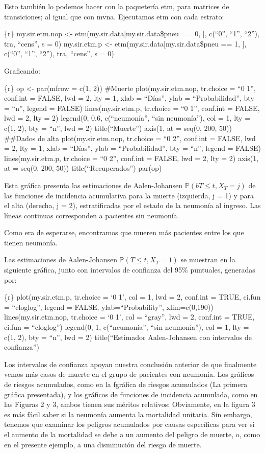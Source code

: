 \documentclass[
]{article}
\begin{document}
Esto también lo podemos hacer con la paquetería etm, para matrices de
transiciones; al igual que con mvna. Ejecutamos etm con cada estrato:

\{r\} my.sir.etm.nop \textless- etm(my.sir.data{[}my.sir.data\$pneu ==
0, {]}, c(``0'', ``1'', ``2''), tra, ``cens'', s = 0) my.sir.etm.p
\textless- etm(my.sir.data{[}my.sir.data\$pneu == 1, {]}, c(``0'',
``1'', ``2''), tra, ``cens'', s = 0)

Graficando:

\{r\} op \textless- par(mfrow = c(1, 2)) \#Muerte plot(my.sir.etm.nop,
tr.choice = ``0 1'', conf.int = FALSE, lwd = 2, lty = 1, xlab =
``Días'', ylab = ``Probabilidad'', bty = ``n'', legend = FALSE)
lines(my.sir.etm.p, tr.choice = ``0 1'', conf.int = FALSE, lwd = 2, lty
= 2) legend(0, 0.6, c(``neumonía'', ``sin neumonía''), col = 1, lty =
c(1, 2), bty = ``n'', lwd = 2) title(``Muerte'') axis(1, at = seq(0,
200, 50)) \#\#Dados de alta plot(my.sir.etm.nop, tr.choice = ``0 2'',
conf.int = FALSE, lwd = 2, lty = 1, xlab = ``Días'', ylab =
``Probabilidad'', bty = ``n'', legend = FALSE) lines(my.sir.etm.p,
tr.choice = ``0 2'', conf.int = FALSE, lwd = 2, lty = 2) axis(1, at =
seq(0, 200, 50)) title(``Recuperados'') par(op)

Esta gráfica presenta las estimaciones de Aalen-Johansen
\(\mathbb{P}( b T \leq t, X_{T} = j)\) de las funciones de incidencia
acumulativa para la muerte (izquierda, j = 1) y para el alta (derecha, j
= 2), estratificadas por el estado de la neumonía al ingreso. Las líneas
continuas corresponden a pacientes sin neumonía.

Como era de esperarse, encontramos que mueren más pacientes entre los
que tienen neumonía.

Las estimaciones de Aalen-Johansen \(\mathbb{P}( T \leq t, X_{T} = 1)\)
se muestran en la siguiente gráfica, junto con intervalos de confianza
del 95\% puntuales, generadas por:

\{r\} plot(my.sir.etm.p, tr.choice = `0 1', col = 1, lwd = 2, conf.int =
TRUE, ci.fun = ``cloglog'', legend = FALSE, ylab=``Probability'',
xlim=c(0,190)) lines(my.sir.etm.nop, tr.choice = `0 1', col = ``gray'',
lwd = 2, conf.int = TRUE, ci.fun = ``cloglog'') legend(0, 1,
c(``neumonía'', ``sin neumonía''), col = 1, lty = c(1, 2), bty = ``n'',
lwd = 2) title(``Estimador Aalen-Johansen con intervalos de confianza'')

Los intervalos de confianza apoyan nuestra conclusión anterior de que
finalmente vemos más casos de muerte en el grupo de pacientes con
neumonía. Los gráficos de riesgos acumulados, como en la fgráfica de
riesgos acumulados (La primera gráfica presentada), y los gráficos de
funciones de incidencia acumulada, como en las Figuras 2 y 3, ambos
tienen sus méritos relativos: Obviamente, en la figura 3 es más fácil
saber si la neumonía aumenta la mortalidad unitaria. Sin embargo,
tenemos que examinar los peligros acumulados por causas específicas para
ver si el aumento de la mortalidad se debe a un aumento del peligro de
muerte, o, como en el presente ejemplo, a una disminución del riesgo de
muerte.
\end{document}

